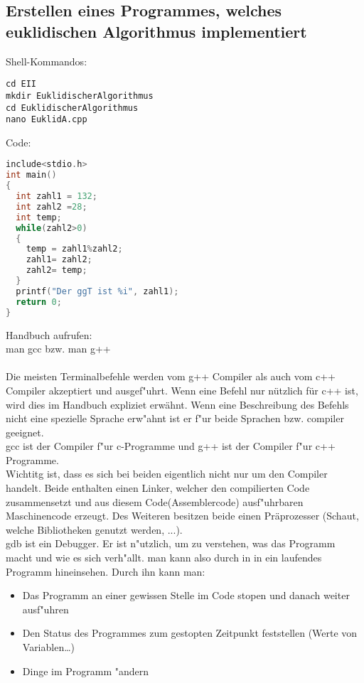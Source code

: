 \documentclass[a4paper,11pt,titlepage]{article}
\begin{document}
\subsection{Erstellen eines Programmes, welches euklidischen Algorithmus implementiert}
Shell-Kommandos:
\begin{verbatim}
cd EII
mkdir EuklidischerAlgorithmus
cd EuklidischerAlgorithmus
nano EuklidA.cpp
\end{verbatim}
Code:
\begin{lstlisting}[language=c++]
include<stdio.h>
int main()
{
  int zahl1 = 132;
  int zahl2 =28; 
  int temp;
  while(zahl2>0) 
  {
    temp = zahl1%zahl2; 
    zahl1= zahl2;
    zahl2= temp;
  }
  printf("Der ggT ist %i", zahl1);
  return 0;
}
\end{lstlisting}
Handbuch aufrufen:\\
man gcc bzw. man g++\\
\\
Die meisten Terminalbefehle werden vom g++ Compiler als auch vom c++ Compiler akzeptiert und ausgef"uhrt. Wenn eine Befehl nur nützlich für c++ ist, wird dies im Handbuch expliziet erwähnt. Wenn eine Beschreibung des Befehls nicht eine spezielle Sprache erw"ahnt ist er f"ur beide Sprachen bzw. compiler geeignet.\\
gcc ist der Compiler f"ur c-Programme und g++ ist der Compiler f"ur c++ Programme.\\
Wichtitg ist, dass es sich bei beiden eigentlich nicht nur um den Compiler handelt. Beide enthalten einen Linker, welcher den compilierten Code zusammensetzt und aus diesem Code(Assemblercode) ausf"uhrbaren Maschinencode erzeugt. Des Weiteren besitzen beide einen Präprozesser (Schaut, welche Bibliotheken genutzt werden, ...). \\
gdb ist ein Debugger. Er ist n"utzlich, um zu verstehen, was das Programm macht und wie es sich verh"allt. man kann also durch in in ein laufendes Programm hineinsehen.
\newpage
Durch ihn kann man:
\begin{itemize}
\item Das Programm an einer gewissen Stelle im Code stopen und danach weiter ausf"uhren
\item Den Status des Programmes zum gestopten Zeitpunkt feststellen (Werte von Variablen\dots)
\item Dinge im Programm "andern
\end{itemize}
\end{document}
